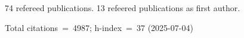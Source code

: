 74 refereed publications. 13 refeered publications as first author.

Total citations~=~4987; h-index~=~37 (2025-07-04)